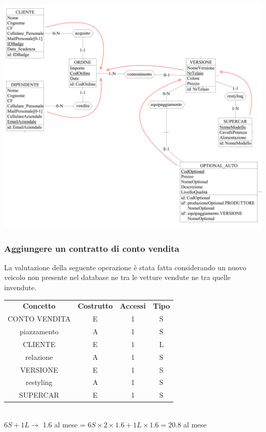 \documentclass[11pt]{article}
\begin{document}
\begin{center}
    \includegraphics[width=\linewidth]{images/navigationSchemes/creaOrdine.png}
\end{center}

\subsubsection{Aggiungere un contratto di conto vendita}

La valutazione della seguente operazione è stata fatta considerando un nuovo
veicolo non presente nel database ne tra le vetture vendute ne tra quelle
invendute.

\begin{table}[H]
    \centering
    \begin{tabular}{ c c c c } 
        \rowcolor{red!20!}
        \textbf{Concetto} & \textbf{Costrutto} & \textbf{Accessi} &
        \textbf{Tipo}\\ 
        CONTO VENDITA & E & 1 & S \\ 
        piazzamento & A & 1 & S \\
        CLIENTE & E & 1 & L \\ 
        relazione & A & 1 & S \\
        VERSIONE & E & 1 & S \\ 
        restyling & A & 1 & S \\
        SUPERCAR & E & 1 & S \\ 
    \end{tabular}\\
    \(6S + 1L \rightarrow \) 1.6 al mese = \( 6S \times 2 \times 1.6 + 1L \times
    1.6 = 20.8 \) al mese  
\end{table}
\end{document}
